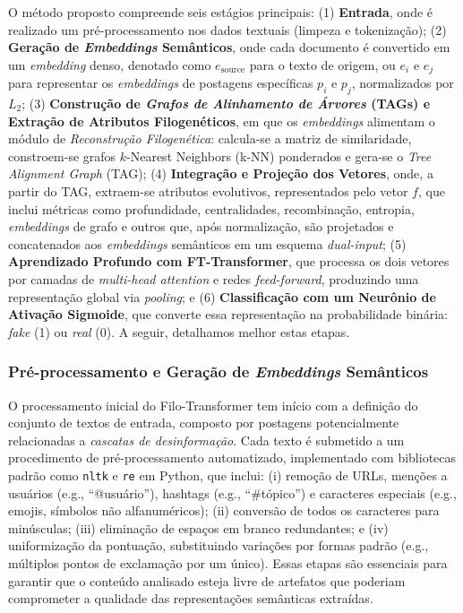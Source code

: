\documentclass[12pt]{article}
\begin{document}
O método proposto compreende seis estágios principais: (1) \textbf{Entrada}, onde é realizado um pré-processamento nos dados textuais (limpeza e tokenização); (2) \textbf{Geração de \textit{Embeddings} Semânticos}, onde cada documento é convertido em um \textit{embedding} denso, denotado como $e_{\text{source}}$ para o texto de origem, ou $e_i$ e $e_j$ para representar os \textit{embeddings} de postagens específicas $p_i$ e $p_j$, normalizados por $L_{2}$; (3) \textbf{Construção de \textit{Grafos de Alinhamento de Árvores} (TAGs) e Extração de Atributos Filogenéticos}, em que os \textit{embeddings} alimentam o módulo de \emph{Reconstrução Filogenética}: calcula-se a matriz de similaridade, constroem-se grafos $k$-Nearest Neighbors (k-NN) ponderados e gera-se o \textit{Tree Alignment Graph} (TAG); (4) \textbf{Integração e Projeção dos Vetores}, onde, a partir do TAG, extraem-se atributos evolutivos, representados pelo vetor $f$, que inclui métricas como profundidade, centralidades, recombinação, entropia, \textit{embeddings} de grafo e outros que, após normalização, são projetados e concatenados aos \textit{embeddings} semânticos em um esquema \emph{dual-input}; (5) \textbf{Aprendizado Profundo com FT-Transformer}, que processa os dois vetores por camadas de \textit{multi-head attention} e redes \textit{feed-forward}, produzindo uma representação global via \textit{pooling}; e (6) \textbf{Classificação com um Neurônio de Ativação Sigmoide}, que converte essa representação na probabilidade binária: \textit{fake} (1) ou \textit{real} (0). A seguir, detalhamos melhor estas etapas.

\subsubsection{Pré-processamento e Geração de \textit{Embeddings} Semânticos}
O processamento inicial do Filo-Transformer tem início com a definição do conjunto de textos de entrada, composto por postagens potencialmente relacionadas a \textit{cascatas de desinformação}. Cada texto é submetido a um procedimento de pré-processamento automatizado, implementado com bibliotecas padrão como \texttt{nltk} e \texttt{re} em Python, que inclui: (i) remoção de URLs, menções a usuários (e.g., ``@usuário''), hashtags (e.g., ``\#tópico'') e caracteres especiais (e.g., emojis, símbolos não alfanuméricos); (ii) conversão de todos os caracteres para minúsculas; (iii) eliminação de espaços em branco redundantes; e (iv) uniformização da pontuação, substituindo variações por formas padrão (e.g., múltiplos pontos de exclamação por um único). Essas etapas são essenciais para garantir que o conteúdo analisado esteja livre de artefatos que poderiam comprometer a qualidade das representações semânticas extraídas.
\end{document}
